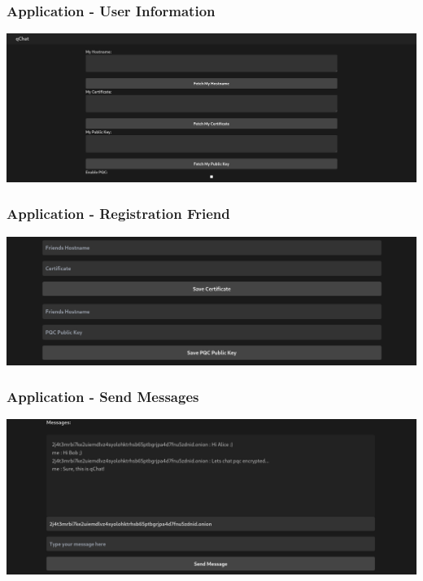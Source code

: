 \documentclass{beamer}
\begin{document}
\begin{frame}
	\frametitle{Application - User Information}
	\begin{center}
	\includegraphics[scale=0.16]{resources/OwnUserCertKey.png}
	\end{center}
\end{frame}

\begin{frame}
	\frametitle{Application - Registration Friend}
	\begin{center}
	\includegraphics[scale=0.22]{resources/RegistrationFriend.png}
\end{center}
\end{frame}

\begin{frame}
	\frametitle{Application - Send Messages}
	\begin{center}
	\includegraphics[scale=0.27]{resources/SendMessages.png}
\end{center}
\end{frame}
\end{document}
